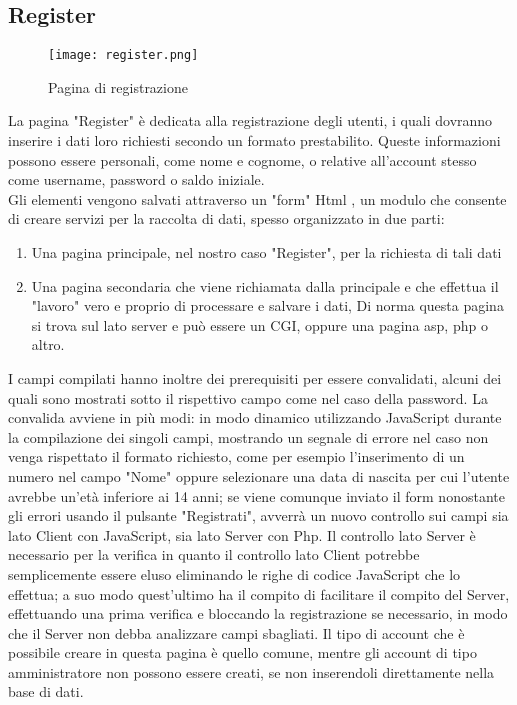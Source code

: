 \documentclass[binding=0.6cm, oneside, noexaminfo, italian]{sapthesis}
\begin{document}
\subsection{Register}
\begin{figure}[h]
    \centering
    \texttt{[image: register.png]}
    \caption{Pagina di registrazione}
    \label{fig:register}
\end{figure}
La pagina "Register" è dedicata alla registrazione degli utenti, i quali dovranno inserire i dati loro richiesti secondo un formato prestabilito. Queste informazioni possono essere personali, come nome e cognome, o relative all'account stesso come username, password o saldo iniziale. \\
Gli elementi vengono salvati attraverso un "form" Html \cite{FormHtml}, un modulo che consente di creare servizi per la raccolta di dati, spesso organizzato in due parti:
\begin{enumerate}
    \item Una pagina principale, nel nostro caso "Register", per la richiesta di tali dati
    \item Una pagina secondaria che viene richiamata dalla principale e che effettua il "lavoro" vero e proprio di processare e salvare i dati, Di norma questa pagina si trova sul lato server e può essere un CGI, oppure una pagina asp, php o altro.
\end{enumerate}
I campi compilati hanno inoltre dei prerequisiti per essere convalidati, alcuni dei quali sono mostrati sotto il rispettivo campo come nel caso della password. La convalida avviene in più modi: in modo dinamico utilizzando JavaScript durante la compilazione dei singoli campi, mostrando un segnale di errore nel caso non venga rispettato il formato richiesto, come per esempio l'inserimento di un numero nel campo "Nome" oppure selezionare una data di nascita per cui l'utente avrebbe un'età inferiore ai 14 anni; se viene comunque inviato il form nonostante gli errori usando il pulsante "Registrati", avverrà un nuovo controllo sui campi sia lato Client con JavaScript, sia lato Server con Php. Il controllo lato Server è necessario per la verifica in quanto il controllo lato Client potrebbe semplicemente essere eluso eliminando le righe di codice JavaScript che lo effettua; a suo modo quest'ultimo ha il compito di facilitare il compito del Server, effettuando una prima verifica e bloccando la registrazione se necessario, in modo che il Server non debba analizzare campi sbagliati. Il tipo di account che è possibile creare in questa pagina è quello comune, mentre gli account di tipo amministratore non possono essere creati, se non inserendoli direttamente nella base di dati.
\end{document}
